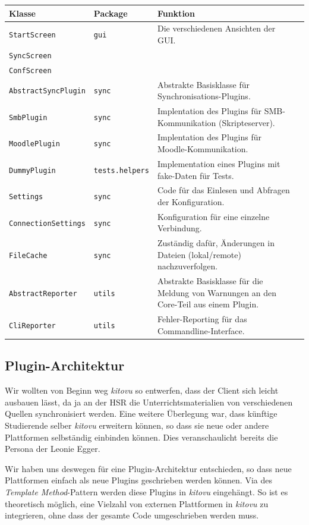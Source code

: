 \documentclass[a4paper]{article}
\begin{document}
\begin{tabulary}{\linewidth}{llLl}
	\toprule
	Klasse & Package & Funktion \\
	\midrule
  \verb|StartScreen| & \verb|gui| & Die verschiedenen Ansichten der GUI. \\
  \verb|SyncScreen| & & \\
  \verb|ConfScreen| & & \\
  \hline
  \verb|AbstractSyncPlugin| & \verb|sync| & Abstrakte Basisklasse für Synchronisations-Plugins. \\
  \verb|SmbPlugin| & \verb|sync| & Implentation des Plugins für SMB-Kommunikation (Skripteserver). \\
  \verb|MoodlePlugin| & \verb|sync| & Implentation des Plugins für Moodle-Kommunikation. \\
  \verb|DummyPlugin| & \verb|tests.helpers| & Implementation eines Plugins mit fake-Daten für Tests. \\
  \hline
  \verb|Settings| & \verb|sync| & Code für das Einlesen und Abfragen der Konfiguration. \\
  \verb|ConnectionSettings| & \verb|sync| & Konfiguration für eine einzelne Verbindung. \\
  \hline
  \verb|FileCache| & \verb|sync| & Zuständig dafür, Änderungen in Dateien (lokal/remote) nachzuverfolgen. \\
  \hline
  \verb|AbstractReporter| & \verb|utils| & Abstrakte Basisklasse für die Meldung von Warnungen an den Core-Teil aus einem Plugin. \\
  \verb|CliReporter| & \verb|utils| & Fehler-Reporting für das Commandline-Interface. \\
	\bottomrule
\end{tabulary}

\subsection{Plugin-Architektur}

Wir wollten von Beginn weg \emph{kitovu} so entwerfen, dass der Client sich leicht ausbauen lässt, da ja an der HSR die Unterrichtsmaterialien von verschiedenen Quellen synchronisiert werden. Eine weitere Überlegung war, dass künftige Studierende selber \emph{kitovu} erweitern können, so dass sie neue oder andere Plattformen selbständig einbinden können. Dies veranschaulicht bereits die Persona der Leonie Egger. 

Wir haben uns deswegen für eine Plugin-Architektur entschieden, so dass neue Plattformen einfach als neue Plugins geschrieben werden können. Via des \emph{Template Method}-Pattern werden diese Plugins in \emph{kitovu} eingehängt. So ist es theoretisch möglich, eine Vielzahl von externen Plattformen in \emph{kitovu} zu integrieren, ohne dass der gesamte Code umgeschrieben werden muss.
\end{document}
